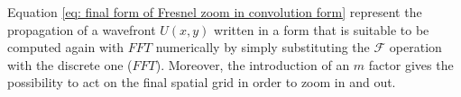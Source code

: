 \documentclass{iucr}              %
\begin{document}
Equation \ref{eq: final form of Fresnel zoom in convolution form} represent the propagation of a wavefront $U(x,y)$ written in a form that is suitable to be computed again with $FFT$ numerically by simply substituting the $\mathcal{F}$ operation with the discrete one ($FFT$). Moreover, the introduction of an $m$ factor gives the possibility to act on the final spatial grid in order to zoom in and out.









%

% 
% 
% 
% 
\end{document}
